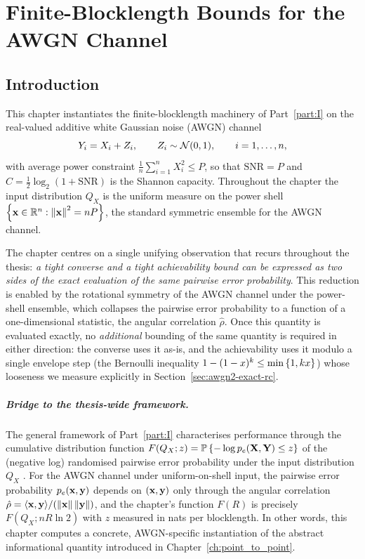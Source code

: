 \chapter{Finite-Blocklength Bounds for the AWGN Channel}
\label{ch:awgn2}

\section{Introduction}
\label{sec:awgn2-intro}

This chapter instantiates the finite-blocklength machinery of Part~\ref{part:I} on the real-valued additive white Gaussian noise (AWGN) channel
\begin{equation}\label{eq:awgn2-model}
	Y_i = X_i + Z_i, \qquad Z_i \sim \mathcal{N}(0, 1), \qquad i = 1, \ldots, n,
\end{equation}
with average power constraint $\frac{1}{n}\sum_{i=1}^n X_i^2 \le P$, so that $\mathrm{SNR} = P$ and $C = \frac{1}{2}\log_2(1 + \mathrm{SNR})$ is the Shannon capacity.  Throughout the chapter the input distribution $Q_X$ is the uniform measure on the power shell $\left\{ \mathbf{x} \in \mathbb{R}^n : \left\Vert \mathbf{x} \right\Vert^2 = nP \right \}$, the standard symmetric ensemble for the AWGN channel.

The chapter centres on a single unifying observation that recurs throughout the thesis: \emph{a tight converse and a tight achievability bound can be expressed as two sides of the \emph{exact} evaluation of the same pairwise error probability}.  This reduction is enabled by the rotational symmetry of the AWGN channel under the power-shell ensemble, which collapses the pairwise error probability to a function of a one-dimensional statistic, the angular correlation $\hat\rho$.  Once this quantity is evaluated exactly, no \emph{additional} bounding of the same quantity is required in either direction: the converse uses it as-is, and the achievability uses it modulo a single envelope step (the Bernoulli inequality $1 - (1-x)^k \le \min\left\{ 1, kx \right \}$) whose looseness we measure explicitly in Section~\ref{sec:awgn2-exact-rc}.

\paragraph{Bridge to the thesis-wide framework.}
The general framework of Part~\ref{part:I} characterises performance through the cumulative distribution function $F(Q_X; z) = \mathbb{P}\left\{ -\log p_e(\textbf{X}, \textbf{Y}) \le z \right\}$ of the (negative log) randomised pairwise error probability under the input distribution $Q_X$ \cite{TODO:thesis-eq-FQXz}.  For the AWGN channel under uniform-on-shell input, the pairwise error probability $p_e(\mathbf{x}, \mathbf{y})$ depends on $(\mathbf{x}, \mathbf{y})$ only through the angular correlation $\hat\rho = \langle \mathbf{x}, \mathbf{y} \rangle/(\left\Vert \mathbf{x} \right\Vert\left\Vert \mathbf{y} \right\Vert)$, and the chapter's function $F(R)$ is precisely $F(Q_X; nR\ln 2)$ with $z$ measured in nats per blocklength.  In other words, this chapter computes a concrete, AWGN-specific instantiation of the abstract informational quantity introduced in Chapter~\ref{ch:point_to_point}.

